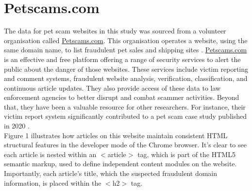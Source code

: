 \documentclass[ oneside,%
                    author={Cassie Qing Tang},
                    degree={BSc},
                     title={An Automated Response System for Disrupting Online Pet Scamming \\ },
                    subtitle={ }]{dissertation}
\begin{document}
\section{Petscams.com}
The data for pet scam websites in this study was sourced from a volunteer organisation called \url{Petscams.com}. This organisation operates a website, using the same domain name, to list fraudulent pet sales and shipping sites \cite{brady_fighting_2024}. \url{Petscams.com} is an effective and free platform offering a range of security services to alert the public about the danger of those websites. These services include victim reporting and comment systems, fraudulent website analysis, verification, classification, and continuous article updates. They also provide access of these data to law enforcement agencies to better disrupt and combat scammer activities. Beyond that, they have been a valuable resource for other researchers. For instance, their victim report system significantly contributed to a pet scam case study published in 2020 \cite{whittaker_understanding_2020}.
\\

Figure 1 illustrates how articles on this website maintain consistent HTML structural features in the developer mode of the Chrome browser. It's clear to see each article is nested within an $<$article$>$ tag, which is part of the HTML5 semantic markup, used to define independent content modules on the website. Importantly, each article's title, which the suspected fraudulent domain information, is placed within the $<$h2$>$ tag. 
\\
\end{document}
